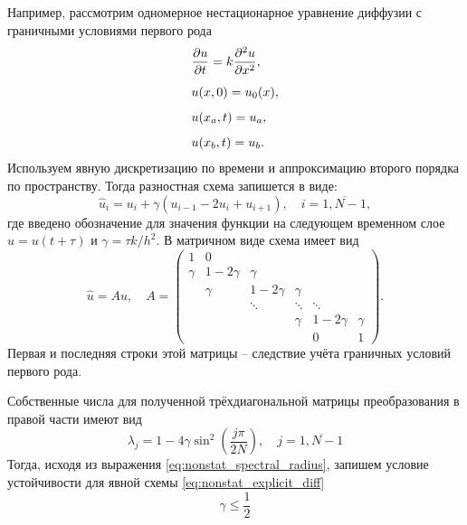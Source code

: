 \label{sec:NonstatExpDiff}

Например, рассмотрим одномерное нестационарное уравнение диффузии с граничными условиями первого рода
\begin{align*}
    &\frac{\partial u}{\partial t} = k\frac{\partial^2 u}{\partial x^2},\\[5pt]
    &u(x, 0) = u_0(x),\\[5pt]
    &u(x_a, t) = u_a,\\[5pt]
    &u(x_b, t) = u_b.\\
\end{align*}
Используем явную дискретизацию по времени и аппроксимацию второго порядка по пространству.
Тогда разностная схема запишется в виде:
\begin{equation}
    \label{eq:nonstat_explicit_diff}
    \hat u_i = u_i + \gamma (u_{i-1} - 2 u_i + u_{i+1}), \quad i = \overline{1, N-1},
\end{equation}
где введено обозначение для значения функции на следующем временном слое $\hat u = u(t+\tau)$ и $\gamma = \tau k / h^2 $.
В матричном виде схема имеет вид
\begin{equation*}
    \hat u = A u, \quad
    A = \left(
        \begin{array}{cccccc}
            1      & 0          &           &            &           &        \\
            \gamma & 1-2\gamma  & \gamma    &            &           &        \\
                   & \gamma     & 1-2\gamma & \gamma     &           &        \\
                   &            & \ddots    & \ddots     & \ddots    &        \\
                   &            &           & \gamma     & 1-2\gamma & \gamma \\ 
                   &            &           &            & 0         & 1      
        \end{array}
    \right).
\end{equation*}
Первая и последняя строки этой матрицы -- следствие учёта граничных условий первого рода.

Собственные числа для полученной трёхдиагональной матрицы преобразования в правой части имеют вид
\begin{equation*}
    \lambda_j = 1 - 4\gamma\sin^2\left(\frac{j\pi}{2 N}\right), \quad j = \overline{1, N-1}
\end{equation*}
Тогда, исходя из выражения \eqref{eq:nonstat_spectral_radius}, запишем условие устойчивости
для явной схемы \eqref{eq:nonstat_explicit_diff}
\begin{equation*}
    \gamma \leq \frac12
\end{equation*}


